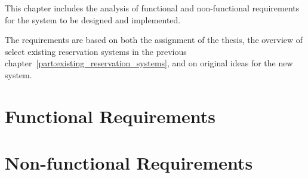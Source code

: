 This chapter includes the analysis of functional and non-functional requirements for the system to be designed and implemented.

The requirements are based on both the assignment of the thesis, the overview of select existing reservation systems in the previous chapter~\ref{part:existing_reservation_systems}, and on original ideas for the new system.

\section{Functional Requirements}
\label{part:functional_requirements}



\section{Non-functional Requirements}
\label{part:non_functional_requirements}


